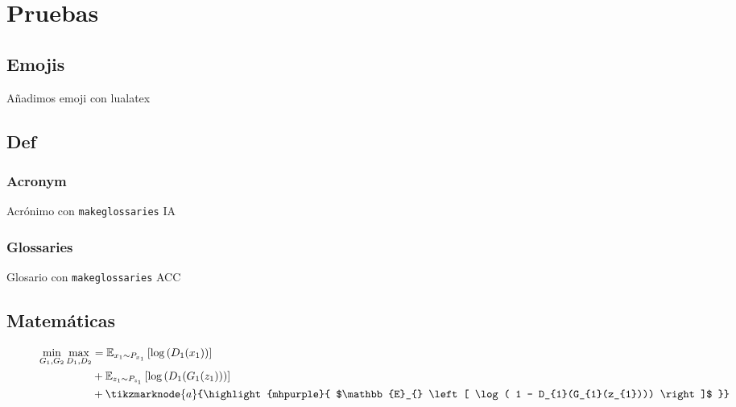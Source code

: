 \chapter*{Pruebas}

\section*{Emojis}

Añadimos emoji con lualatex {}

\section*{Def}

\subsection*{Acronym}

Acrónimo con \texttt{makeglossaries} \acrshort{IA}

\subsection*{Glossaries}

Glosario con \texttt{makeglossaries} \gls{ACC}

\section*{Matemáticas}

% 

\begin{wrapfigure}{l}{\columnwidth}
    \vspace{\baselineskip}
    \begin{equation}
        \begin{split}
            \min_{G_{1},G_{2}}\max_{D_{1},D_{2}}
             & = \mathbb{E}_{x_{1}\sim{}P_{x_{1}}} \left[ \log{\left( D_{1}(x_{1})        \right)} \right] \\
             & + \mathbb{E}_{z_{1}\sim{}P_{z_{1}}} \left[ \log{\left( D_{1}(G_{1}(z_{1})) \right)} \right] \\
             & + \tikzmarknode{a}{\highlight{mhpurple}{
                    $\mathbb{E}_{} \left[ \log( 1 - D_{1}(G_{1}(z_{1}))) \right]$
                }}
        \end{split}
    \end{equation}
    \vspace{1.2\baselineskip}
\end{wrapfigure}